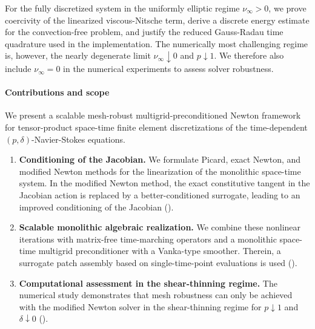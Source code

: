 \documentclass[DIV=16]{scrartcl}
\newcommand{\reg}{\delta}
\newcommand{\pn}{p}
\begin{document}
For the fully discretized system in the uniformly elliptic regime $\nu_\infty>0$,
we prove coercivity of the linearized viscous-Nitsche term, derive a discrete
energy estimate for the convection-free problem, and justify the reduced
Gauss-Radau time quadrature used in the implementation. The numerically most
challenging regime is, however, the nearly degenerate limit
$\nu_\infty\downarrow 0$ and $\pn\downarrow 1$. We therefore also include
$\nu_\infty=0$ in the numerical experiments to assess solver robustness.

\paragraph{Contributions and scope}
We present a scalable mesh-robust multigrid-preconditioned Newton framework for
tensor-product space-time finite element discretizations of the time-dependent
$(\pn,\reg)$-Navier-Stokes equations.
\begin{enumerate}
\item \textbf{Conditioning of the Jacobian.} We formulate Picard, exact
  Newton, and modified Newton methods for the linearization of the monolithic
  space-time system. In the modified Newton method, the exact constitutive
  tangent in the Jacobian action is replaced by a better-conditioned
  surrogate, leading to an improved conditioning of the Jacobian
  ().

\item \textbf{Scalable monolithic algebraic realization.} We combine these
  nonlinear iterations with matrix-free time-marching operators and a monolithic
  space-time multigrid preconditioner with a Vanka-type smoother. Therein, a
  surrogate patch assembly based on single-time-point evaluations is used
  ().

\item \textbf{Computational assessment in the shear-thinning regime.} The
  numerical study demonstrates that mesh robustness can only be achieved with the
  modified Newton solver in the shear-thinning regime for $\pn\downarrow 1$ and
  $\reg \downarrow 0$ ().
\end{enumerate}
\end{document}
